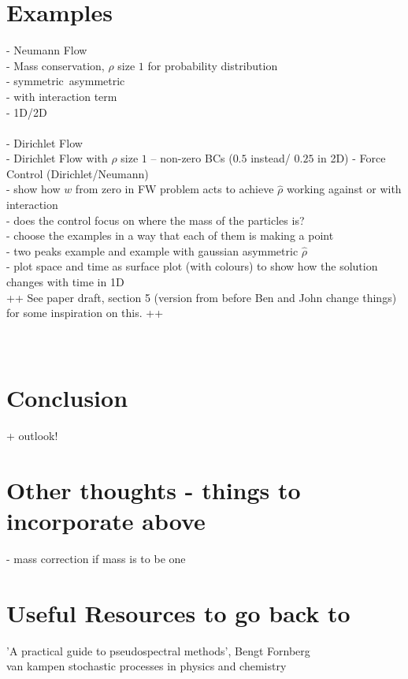 \documentclass[11pt, a4paper]{article}
\theoremstyle{definition}
\begin{document}
\section{Examples}
- Neumann Flow\\
- Mass conservation, $\rho$ size $1$ for probability distribution\\
- symmetric\ asymmetric\\
- with interaction term \\
- 1D/2D \\
\\
- Dirichlet Flow \\
- Dirichlet Flow with $\rho$ size $1$ -- non-zero BCs ($0.5$ instead/ $0.25$ in 2D)
- Force Control (Dirichlet/Neumann) \\
- show how $w$ from zero in FW problem acts to achieve $\hat \rho$ working against or with interaction\\
- does the control focus on where the mass of the particles is?\\
- choose the examples in a way that each of them is making a point\\
- two peaks example and example with gaussian asymmetric $\hat \rho$\\
- plot space and time as surface plot (with colours) to show how the solution changes with time in 1D\\

++ See paper draft, section 5 (version from before Ben and John change things) for some inspiration on this. ++ \\
\\
\\


\section{Conclusion}
+ outlook!


\pagebreak	



\pagebreak
\appendix

\section{Other thoughts - things to incorporate above}
- mass correction if mass is to be one\\


\section{Useful Resources to go back to}
'A practical guide to pseudospectral methods', Bengt Fornberg\\
van kampen stochastic processes in physics and chemistry
\end{document}
